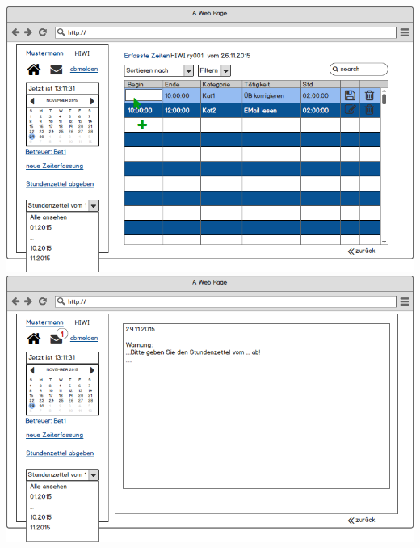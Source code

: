 \includegraphics[width=\linewidth]{UI/Benutzer/Editieren.png}
\includegraphics[width=\linewidth]{UI/Benutzer/Nachricht.png}

